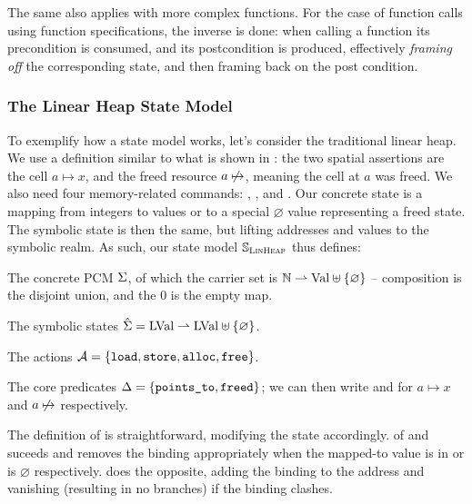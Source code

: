 The same also applies with more complex functions. For the case of function calls using function specifications, the inverse is done: when calling a function its precondition is consumed, and its postcondition is produced, effectively \emph{framing off} the corresponding state, and then framing back on the post condition.

\subsubsection{The Linear Heap State Model}

To exemplify how a state model works, let's consider the traditional linear heap. We use a definition similar to what is shown in \cite{isl}: the two spatial assertions are the cell $a\mapsto x$, and the freed resource $a\not\mapsto$, meaning the cell at $a$ was freed. We also need four memory-related commands: \load, \store, \alloc{} and \free{}. Our concrete state is a mapping from integers to values or to a special $\varnothing$ value representing a freed state. The symbolic state is then the same, but lifting addresses and values to the symbolic realm. As such, our state model $\mathbb S_{\textsc{LinHeap}}$ thus defines: \begin{compactitem}
 \item The concrete PCM $\Sigma$, of which the carrier set is $\mathbb N\rightharpoonup \text{Val} \uplus \{\varnothing\}$ -- composition is the disjoint union, and the $0$ is the empty map.
 \item The symbolic states $\hat{\Sigma} = \text{LVal} \rightharpoonup \text{LVal} \uplus\{\varnothing\}$.
 \item The actions ${\cal{A}}=\{\texttt{load},\texttt{store},\texttt{alloc},\texttt{free}\}$.
 \item The core predicates $\Delta=\{\texttt{points\_to}, \texttt{freed}\}$; we can then write  and  for $a\mapsto x$ and $a\not\mapsto$ respectively.
 \end{compactitem}

 The definition of \execac{} is straightforward, modifying the state accordingly. \consume{} of \pointsto{} and \freedP{} suceeds and removes the binding appropriately when the mapped-to value is in \LVal{} or is $\varnothing$ respectively. \produce{} does the opposite, adding the binding to the address and vanishing (resulting in no branches) if the binding clashes.

